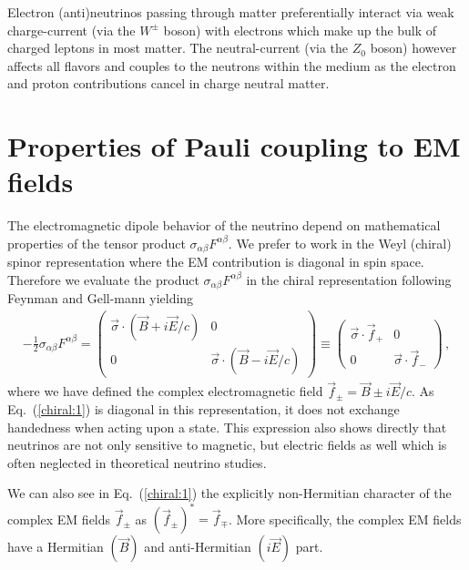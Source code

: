 \documentclass[addchapnum]{ws-rv961x669} %
\newcommand{\req}[1]{Eq.~(\ref{#1})}
\begin{document}
Electron (anti)neutrinos passing through matter preferentially interact via weak charge-current (via the $W^{\pm}$ boson) with electrons which make up the bulk of charged leptons in most matter. The neutral-current (via the $Z_{0}$ boson) however affects all flavors and couples to the neutrons within the medium as the electron and proton contributions cancel in charge neutral matter.

\section{Properties of Pauli coupling to EM fields}
\label{sec:numoment}
The electromagnetic dipole behavior of the neutrino depend on mathematical properties of the tensor product $\sigma_{\alpha\beta}F^{\alpha\beta}$. We prefer to work in the Weyl (chiral) spinor representation where the EM contribution is diagonal in spin space. Therefore we evaluate the product $\sigma_{\alpha\beta}F^{\alpha\beta}$ in the chiral representation following Feynman and Gell-mann\cite{Feynman:1958ty} yielding
\begin{align}
    \label{chiral:1}
    -\frac{1}{2}\sigma_{\alpha\beta}F^{\alpha\beta}=
    \begin{pmatrix}
        \vec{\sigma}\cdot(\vec{B}+i\vec{E}/c) & 0\\
        0 & \vec{\sigma}\cdot(\vec{B}-i\vec{E}/c)
    \end{pmatrix}\equiv
    \begin{pmatrix}
        \vec{\sigma}\cdot\vec{f}_{+} & 0 \\
        0 & \vec{\sigma}\cdot\vec{f}_{-}
    \end{pmatrix}\,,
\end{align}
where we have defined the complex electromagnetic field $\vec{f}_{\pm}=\vec{B}\pm i\vec{E}/c$. As \req{chiral:1} is diagonal in this representation, it does not exchange handedness when acting upon a state. This expression also shows directly that neutrinos are not only sensitive to magnetic, but electric fields as well which is often neglected in theoretical neutrino studies.

We can also see in \req{chiral:1} the explicitly non-Hermitian character of the complex EM fields $\vec{f}_{\pm}$ as $(\vec{f}_{\pm})^{*}=\vec{f}_{\mp}$. More specifically, the complex EM fields have a Hermitian $(\vec{B})$ and anti-Hermitian $(i\vec{E})$ part.
\end{document}
